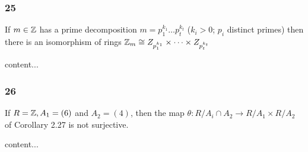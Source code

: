 \subsubsection*{25}
\begin{graybox}
	If $m \in \mathbb{Z}$ has a prime decomposition $m = p_1^{k_1}\dots p_t^{k_t}$ ($k_i > 0$; $p_i$ distinct primes) then there is an isomorphism of rings $\mathbb{Z}_m \cong Z_{p_1^{k_1}} \times \dots \times Z_{p_t^{k_t}}$
\end{graybox}
\begin{solution}
	content...
\end{solution}

\subsubsection*{26}
\begin{graybox}
	If $R = \mathbb{Z}, A_1 = (6)$ and $A_2 = (4)$, then the map $\theta : R/A_i \cap A_2 \to R/A_1 \times R/A_2$ of Corollary 2.27 is not surjective.
\end{graybox}
\begin{solution}
	content...
\end{solution}